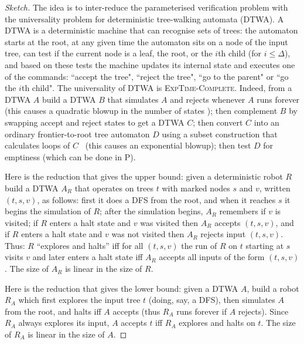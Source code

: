 \documentclass{aamas2015}
\def\exptimeC{\textsc{ExpTime-Complete}}
\def\ptime{\textsc{P}}
\begin{document}
\begin{proof}[Sketch]
The idea is to inter-reduce the parameterised verification problem with the universality problem for deterministic tree-walking automata (DTWA). 
A DTWA is a deterministic machine that can recognise sets of trees: the automaton starts at the root, at any given time the automaton sits on a node of the input tree, can test if the current node is a leaf, the root, or the $i$th child (for $i \leq \Delta$), and based on these tests the machine updates its internal state and executes one of the commands: ``accept the tree", ``reject the tree", ``go to the parent" or ``go the $i$th child".
The universality of DTWA is \exptimeC.
Indeed, from a DTWA $A$ build a DTWA $B$ that simulates $A$ and rejects whenever $A$ runs forever (this causes a quadratic blowup in the number of states \cite{MML06}); then complement $B$ by swapping accept and reject states to get a DTWA $C$; then convert $C$ into an ordinary frontier-to-root tree automaton $D$ using a subset construction that calculates loops of $C$~\cite[Fact $1$]{Boja08} (this causes an exponential blowup); then test $D$ for emptiness (which can be done in \ptime).

Here is the reduction that gives the upper bound: given a deterministic robot $R$ build a DTWA $A_R$ that operates on trees $t$ with marked nodes $s$ and $v$, written $(t,s,v)$, as follows: first it does a DFS from the root, and when it reaches $s$ it begins the simulation of $R$; after the simulation begins, $A_R$ remembers if $v$ is visited; if $R$ enters a halt state and $v$ was visited then $A_R$ accepts $(t,s,v)$, and if $R$ enters a halt state and $v$ was not visited then $A_R$ rejects input $(t,s,v)$. Thus: $R$ ``explores and halts'' iff for all $(t,s,v)$ the run of $R$ on $t$ starting at $s$ visits $v$ and later enters a halt state iff $A_R$ accepts all inputs of the form $(t,s,v)$. The size of $A_R$ is linear in the size of $R$. 

Here is the reduction that gives the lower bound: given a DTWA $A$, build a robot $R_A$ which first explores the input tree $t$ (doing, say, a DFS), then simulates $A$ from the root, and halts iff $A$ accepts (thus $R_A$ runs forever if $A$ rejects). Since $R_A$ always explores its input,  $A$ accepts $t$ iff $R_A$ explores and halts on $t$. The size of $R_A$ is linear in the size of $A$.
\end{proof}
\end{document}
